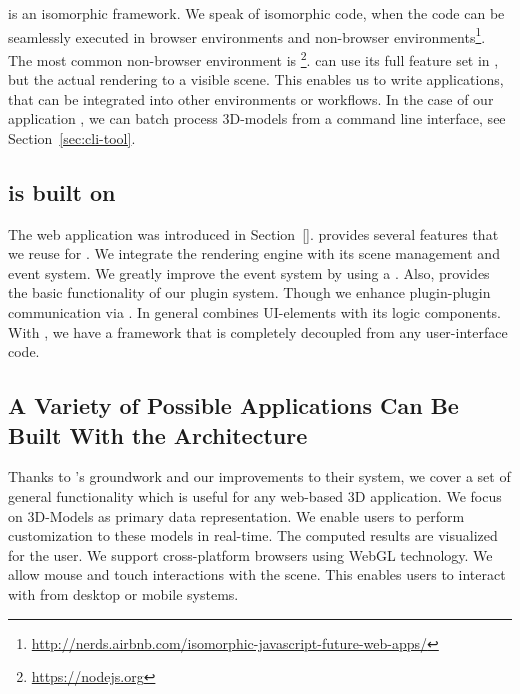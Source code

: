 \documentclass[../../ClassicThesis.tex]{subfiles}
\begin{document}
{\convertify} is an isomorphic framework. We speak of isomorphic
{\javascript} code, when the code can be seamlessly executed in
browser environments and non-browser
environments\footnote{\url{http://nerds.airbnb.com/isomorphic-javascript-future-web-apps/}}.
The most common non-browser {\javascript} environment is
{\nodejs}\footnote{\url{https://nodejs.org}}. {\convertify} can use
its full feature set in {\nodejs}, but the actual rendering to a
visible scene. This enables us to write applications, that can be
integrated into other environments or workflows. In the case of our
application {\platener}, we can batch process 3D-models from a command
line interface, see Section~\ref{sec:cli-tool}.



\subsection{{\convertify} is built on {\brickify}}
\label{sec:brickify-comparison}

The web application {\brickify} was introduced in
Section~\ref{}. {\brickify} provides several
features that we reuse for {\convertify}. We integrate the rendering
engine with its scene management and event system. We greatly improve
the event system by using a . Also, {\brickify}
provides the basic functionality of our plugin system. Though we
enhance plugin-plugin communication via . In general
{\brickify} combines UI-elements with its logic components. With
{\convertify}, we have a framework that is completely decoupled from
any user-interface code.

\subsection{A Variety of Possible Applications Can Be Built With the {\convertify} Architecture}
\label{sec:variety-of-applications}

Thanks to {\brickify}'s groundwork and our improvements to their
system, we cover a set of general functionality which is useful for
any web-based 3D application. We focus on 3D-Models as primary data
representation. We enable users to perform customization to these
models in real-time. The computed results are visualized for the user.
We support cross-platform browsers using WebGL technology. We allow
mouse and touch interactions with the scene. This enables users to
interact with {\convertify} from desktop or mobile systems.

\end{document}
